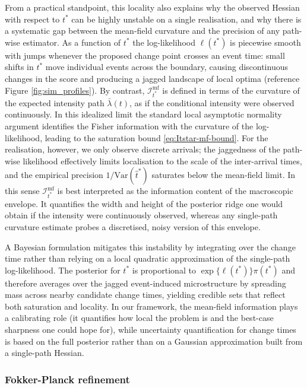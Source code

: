 \documentclass{article}
\theoremstyle{plain}
\theoremstyle{definition}
\newcommand{\Var}{\mathrm{Var}}
\newcommand{\1}{\mathbf{1}}
\begin{document}
    From a practical standpoint, this locality also explains why the observed Hessian with respect to $t^\ast$ can be highly unstable on a single realisation, and why there is a systematic gap between the mean-field curvature and the precision of any path-wise estimator. As a function of $t^\ast$ the log-likelihood $\ell(t^\ast)$ is piecewise smooth with jumps whenever the proposed change point crosses an event time: small shifts in $t^\ast$ move individual events across the boundary, causing discontinuous changes in the score and producing a jagged landscape of local optima (reference Figure \ref{fig:sim_profiles}). By contrast, $\mathcal I_{t^\ast}^{\mathrm{mf}}$ is defined in terms of the curvature of the expected intensity path $\bar\lambda(t)$, as if the conditional intensity were observed continuously. In this idealized limit the standard local asymptotic normality argument identifies the Fisher information with the curvature of the log-likelihood, leading to the saturation bound \eqref{eq:Itstar-mf-bound}. For the realisation, however, we only observe discrete arrivals; the jaggedness of the path-wise likelihood effectively limits localisation to the scale of the inter-arrival times, and the empirical precision $1/\Var(\hat t^\ast)$ saturates below the mean-field limit. In this sense $\mathcal I_{t^\ast}^{\mathrm{mf}}$ is best interpreted as the information content of the macroscopic envelope. It quantifies the width and height of the posterior ridge one would obtain if the intensity were continuously observed, whereas any single-path curvature estimate probes a discretised, noisy version of this envelope.
    
   A Bayesian formulation mitigates this instability by integrating over the change time rather than relying on a local quadratic approximation of the single-path log-likelihood. The posterior for $t^\ast$ is proportional to $\exp\{\ell(t^\ast)\}\pi(t^\ast)$ and therefore averages over the jagged event-induced microstructure by spreading mass across nearby candidate change times, yielding credible sets that reflect both saturation and locality. In our framework, the mean-field information plays a calibrating role (it quantifies how local the problem is and the best-case sharpness one could hope for), while uncertainty quantification for change times is based on the full posterior rather than on a Gaussian approximation built from a single-path Hessian.
    
    \subsubsection{Fokker-Planck refinement}
    
\end{document}
